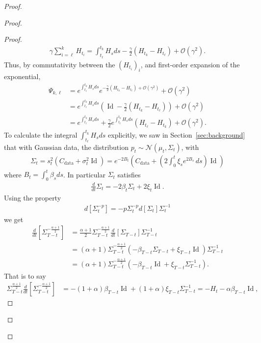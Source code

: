\documentclass[11pt]{article}
\newcommand{\id}{\operatorname{Id}}
\begin{document}
\begin{proof}
\begin{proof}
\begin{proof}
\begin{align*}
\gamma \sum_{i=\ell}^k H_{t_i} = \int_{t_\ell}^{t_k} H_s ds - \frac{\gamma}{2}(H_{t_k} - H_{t_\ell}) + \mathcal{O}(\gamma^2) %
.
\end{align*}
Thus, by commutativity between the $(H_{t_i})_i$, and first-order expansion of the exponential,
\begin{align*}
\Psi_{k,\ell} &= e^{\int_{t_\ell}^{t_k} H_s ds}e^{- \frac{\gamma}{2}(H_{t_k} - H_{t_\ell}) + \mathcal{O}(\gamma^2)} + \mathcal{O}(\gamma^2)\\ 
&= e^{\int_{t_\ell}^{t_k} H_s ds}(\id - \frac{\gamma}{2}(H_{t_k} - H_{t_\ell})) + \mathcal{O}(\gamma^2) \\
&= e^{\int_{t_\ell}^{t_k} H_s ds} +  \frac{\gamma}{2} e^{\int_{t_\ell}^{t_k} H_s ds}(H_{t_\ell}-H_{t_k}) + \mathcal{O}(\gamma^2).
\end{align*}
To calculate the integral $\int_{t_\ell}^{t_k} H_s ds$ explicitly, we saw in Section~\ref{sec:background} that with Gaussian data, the distribution $p_t \sim \mathcal{N} (\mu_t, \Sigma_t)$, with
\begin{align*}
    \Sigma_t = s_t^2(C_{\mathrm{data}} + \sigma_t^2\id) = e^{-2 B_t} \left( C_{\mathrm{data}} +  \left(2 \int_0^t \xi_s e^{2B_s} \, ds \right) \id \right)
\end{align*}
where $B_t = \int_0^t \beta_s ds$. In particular $\Sigma_t$ satisfies 
\begin{align*}
\frac{d}{dt}\Sigma_t = - 2\beta_{t} \Sigma_t + 2\xi_t \id.
\end{align*}
Using the property
\begin{align*}
d[\Sigma_t^{-p}] = - p  \Sigma_t^{-p} d[\Sigma_t] \Sigma_t^{-1}
\end{align*}
we get 
\begin{align*}
\frac{d}{dt}[\Sigma_{T-t}^{-\frac{\alpha + 1}{2}}] &= \frac{\alpha + 1}{2} \Sigma_{T-t}^{-\frac{\alpha + 1}{2}} \frac{d}{dt}[\Sigma_{T-t}]  \Sigma_{T-t}^{-1} \\
& =  (\alpha + 1) \Sigma_{T-t}^{-\frac{\alpha + 1}{2}}(- \beta_{T-t} \Sigma_{T-t} + \xi_{T-t} \id)  \Sigma_{T-t}^{-1} \\
&= (\alpha + 1) \Sigma_{T-t}^{-\frac{\alpha + 1}{2}}( - \beta_{T-t} \id + \xi_{T-t} \Sigma_{T-t}^{-1}).
\end{align*}
That is to say
\begin{align*}
\Sigma_{T-t}^{\frac{\alpha + 1}{2}} \frac{d}{dt} \left[\Sigma_{T-t}^{-\frac{\alpha + 1}{2}}\right] &= - (1+\alpha) \beta_{T-t} \id + (1+\alpha) \xi_{T-t} \Sigma_{T-t}^{-1} = - H_t - \alpha  \beta_{T-t} \id, 

\end{align*}
\end{proof}
\end{proof}
\end{proof}
\end{document}
